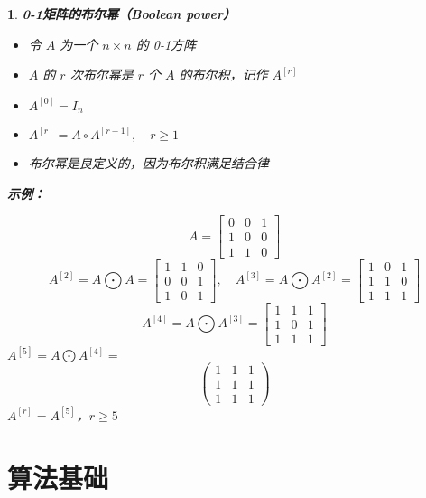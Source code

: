 \documentclass[UTF8]{report}
\theoremstyle{MyLineTheoremStyle} %
\theoremstyle{MyBlockTheoremStyle} %
\theoremstyle{MySubsubsectionStyle} %
\newtheorem{definition}{}
\begin{document}
\begin{definition}
 \textbf{0-1矩阵的布尔幂（Boolean power）}\par
    \begin{itemize}
        \item 令 $A$ 为一个 $n \times n$ 的 0-1方阵
        \item $A$ 的 $r$ 次布尔幂是 $r$ 个 $A$ 的布尔积，记作 $A^{[r]}$
        \item $A^{[0]} = I_n$
        \item $A^{[r]} = A \circ A^{[r-1]}, \quad r \geq 1$
        \item 布尔幂是良定义的，因为布尔积满足结合律
    \end{itemize}

    \textbf{示例：}\par
    \[
    A =
    \begin{bmatrix}
    0 & 0 & 1 \\
    1 & 0 & 0 \\
    1 & 1 & 0
    \end{bmatrix}
    \]
    \[
    A^{[2]} = A \bigodot  A =
    \begin{bmatrix}
    1 & 1 & 0 \\
    0 & 0 & 1 \\
    1 & 0 & 1
    \end{bmatrix}
    , \quad
    A^{[3]} = A \bigodot  A^{[2]} =
    \begin{bmatrix}
    1 & 0 & 1 \\
    1 & 1 & 0 \\
    1 & 1 & 1
    \end{bmatrix}
    \]
    \[
    A^{[4]} = A \bigodot  A^{[3]} =
    \begin{bmatrix}
    1 & 1 & 1 \\
    1 & 0 & 1 \\
    1 & 1 & 1
    \end{bmatrix}
\]
$A^{[5]} = A \bigodot  A^{[4]} =$
\[
\begin{pmatrix}
1 & 1 & 1 \\
1 & 1 & 1 \\
1 & 1 & 1
\end{pmatrix}
\]
$A^{[r]} = A^{[5]}$，$r \geq 5$
\end{definition}



\chapter{算法基础}\thispagestyle{fancy} 
\end{document}
